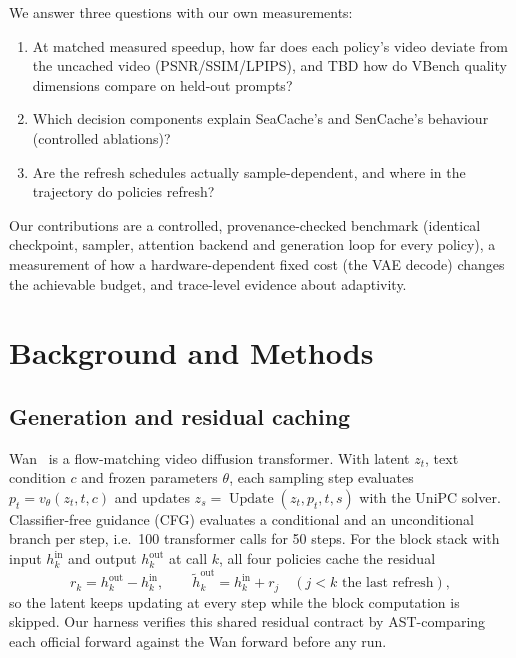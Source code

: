 \documentclass[11pt,a4paper]{article}
\newcommand{\pending}{\textcolor{draftorange}{\textsf{TBD}}}
\begin{document}
We answer three questions with our own measurements:
\begin{enumerate}[label=RQ\arabic*.]
\item At matched measured speedup, how far does each policy's video deviate from the uncached video (PSNR/SSIM/LPIPS), and
\pending{} how do VBench quality dimensions compare on held-out prompts?
\item Which decision components explain SeaCache's and SenCache's behaviour (controlled ablations)?
\item Are the refresh schedules actually sample-dependent, and where in the trajectory do policies refresh?
\end{enumerate}
Our contributions are a controlled, provenance-checked benchmark (identical checkpoint, sampler, attention backend and
generation loop for every policy), a measurement of how a hardware-dependent fixed cost (the VAE decode) changes the
achievable budget, and trace-level evidence about adaptivity.

\section{Background and Methods}
\subsection{Generation and residual caching}
Wan~\citep{wan2025wan} is a flow-matching video diffusion transformer. With latent $z_t$, text condition $c$ and frozen
parameters $\theta$, each sampling step evaluates $p_t=v_\theta(z_t,t,c)$ and updates $z_s=\operatorname{Update}(z_t,p_t,t,s)$
with the UniPC solver. Classifier-free guidance (CFG) evaluates a conditional and an unconditional branch per step, i.e.\
100 transformer calls for 50 steps. For the block stack with input $h_k^{\mathrm{in}}$ and output $h_k^{\mathrm{out}}$ at call
$k$, all four policies cache the residual
\begin{equation}
r_k=h_k^{\mathrm{out}}-h_k^{\mathrm{in}},\qquad \widetilde h_k^{\mathrm{out}}=h_k^{\mathrm{in}}+r_j\quad(j<k\text{ the last refresh}),
\end{equation}
so the latent keeps updating at every step while the block computation is skipped. Our harness verifies this shared
residual contract by AST-comparing each official forward against the Wan forward before any run.
\end{document}
